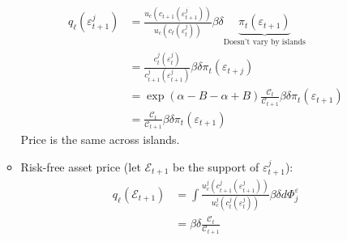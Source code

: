\documentclass{article}
\begin{document}
\begin{enumerate}
\begin{itemize}
\begin{align*}
q_\ell(\varepsilon_{t+1}^j) 
&= \frac{u_c(c_{t+1}(\varepsilon_{t+1}^j))}{u_c(c_{t}(\varepsilon_{t}^j))} \beta \delta \underbrace{\pi_t(\varepsilon_{t+1})}_{\text{Doesn't vary by islands}}\\
&= \frac{c_t^j(\varepsilon_t^j)}{c_{t+1}^j(\varepsilon_{t+1}^j)} \beta \delta \pi_t(\varepsilon_{t+j})\\
&= \exp(\alpha - B -\alpha + B) \frac{\mathcal{C}_t}{\mathcal{C}_{t+1}} \beta \delta \pi_t(\varepsilon_{t+1})\\
&= \frac{\mathcal{C}_t}{\mathcal{C}_{t+1}} \beta \delta \pi_t(\varepsilon_{t+1})
\end{align*}
Price is the same across islands.
\item Risk-free asset price (let $\mathcal{E}_{t+1}$ be the support of $\varepsilon_{t+1}^j$):
\begin{align*}
q_\ell(\mathcal{E}_{t+1}) 
&= \int \frac{u_c^j(c_{t+1}^j(\varepsilon_{t+1}^j))}{u_c^j(c_{t}^j(\varepsilon_{t}^j))} \beta \delta d \Phi_j^\varepsilon\\
&= \beta \delta \frac{\mathcal{C}_t}{\mathcal{C}_{t+1}}
\end{align*}


\end{itemize}
\end{enumerate}
\end{document}

